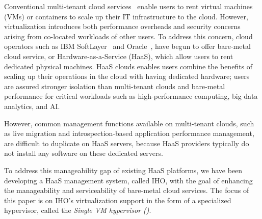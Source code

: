 Conventional multi-tenant cloud services~\cite{ec2,azure,gcp} enable
users to rent virtual machines (VMs) or containers to scale 
up their IT infrastructure to the cloud. However, virtualization
introduces both performance overheads and security concerns
arising from co-located workloads of other users.
To address this concern, cloud operators 
such as  IBM SoftLayer~\cite{softlayer} and Oracle~\cite{oracle},
have begun to offer bare-metal cloud service, or Hardware-as-a-Service (HaaS),
which allow users to rent dedicated  physical machines.
HaaS clouds enables users combine the benefits of 
scaling up their operations in the cloud with having dedicated 
hardware; users are assured stronger isolation than multi-tenant clouds and 
bare-metal performance for critical workloads 
such as high-performance computing, big data analytics, and AI.

However, common management functions available on multi-tenant clouds,
such as live migration and introspection-based 
application performance management, are difficult to 
duplicate on HaaS servers, because HaaS providers typically 
do not install any software on these dedicated servers.

To address this manageability gap of existing HaaS platforms, 
we have been developing a HaaS management system, called 
IHO,
with the goal of enhancing the manageability and serviceability 
of bare-metal cloud services.
The focus of this paper is on IHO's virtualization support
in the form of a specialized hypervisor, called the {\em Single VM
hypervisor (\sna)}.



